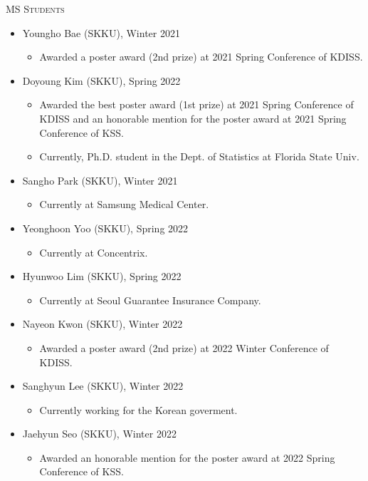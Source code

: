 \documentclass[10pt]{article}
\newenvironment{innerlist}[1][\enskip\textbullet]%
        {\begin{itemize}[#1,leftmargin=*,parsep=0pt,itemsep=0pt,topsep=0pt,partopsep=0pt]}
        {\end{itemize}}
\begin{document}
\medskip
\textsc{MS Students}
\smallskip
\begin{innerlist}
\item[] Youngho Bae (SKKU), Winter 2021
\begin{innerlist}
\item[] Awarded a poster award (2nd prize) at 2021 Spring Conference of KDISS.
\end{innerlist}
\item[] Doyoung Kim (SKKU), Spring 2022
\begin{innerlist}
\item[] Awarded the best poster award (1st prize) at 2021 Spring Conference of KDISS and an honorable mention for the poster award at 2021 Spring Conference of KSS.
\item[] Currently, Ph.D. student in the Dept. of Statistics at Florida State Univ.
\end{innerlist}
\item[] Sangho Park (SKKU), Winter 2021
\begin{innerlist}
\item[] Currently at Samsung Medical Center.
\end{innerlist}
\item[] Yeonghoon Yoo (SKKU), Spring 2022
\begin{innerlist}
\item[] Currently at Concentrix.
\end{innerlist}
\item[] Hyunwoo Lim (SKKU), Spring 2022
\begin{innerlist}
\item[] Currently at Seoul Guarantee Insurance Company.
\end{innerlist}
\item[] Nayeon Kwon (SKKU), Winter 2022
\begin{innerlist}
\item[] Awarded a poster award (2nd prize) at 2022 Winter Conference of KDISS.
\end{innerlist}
\item[] Sanghyun Lee (SKKU), Winter 2022
\begin{innerlist}
\item[] Currently working for the Korean goverment.
\end{innerlist}
\item[] Jaehyun Seo (SKKU), Winter 2022
\begin{innerlist}
\item[] Awarded an honorable mention for the poster award at 2022 Spring Conference of KSS.

\end{innerlist}
\end{innerlist}
\end{document}
